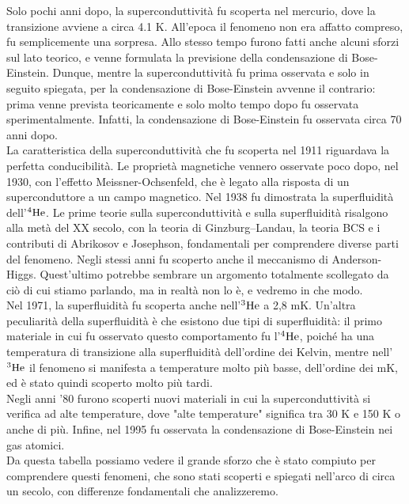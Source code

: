 Solo pochi anni dopo, la superconduttività fu scoperta nel mercurio, dove la transizione avviene a circa 4.1 K. All'epoca il fenomeno non era affatto compreso, fu semplicemente una sorpresa. Allo stesso tempo furono fatti anche alcuni sforzi sul lato teorico, e venne formulata la previsione della condensazione di Bose-Einstein. Dunque, mentre la superconduttività fu prima osservata e solo in seguito spiegata, per la condensazione di Bose-Einstein avvenne il contrario: prima venne prevista teoricamente e solo molto tempo dopo fu osservata sperimentalmente. Infatti, la condensazione di Bose-Einstein fu osservata circa 70 anni dopo.\\
La caratteristica della superconduttività che fu scoperta nel 1911 riguardava la perfetta conducibilità. Le proprietà magnetiche vennero osservate poco dopo, nel 1930, con l'effetto Meissner-Ochsenfeld, che è legato alla risposta di un superconduttore a un campo magnetico. Nel 1938 fu dimostrata la superfluidità dell'$\rm ^4He$. Le prime teorie sulla superconduttività e sulla superfluidità risalgono alla metà del XX secolo, con la teoria di Ginzburg--Landau, la teoria BCS e i contributi di Abrikosov e Josephson, fondamentali per comprendere diverse parti del fenomeno. Negli stessi anni fu scoperto anche il meccanismo di Anderson-Higgs. Quest'ultimo potrebbe sembrare un argomento totalmente scollegato da ciò di cui stiamo parlando, ma in realtà non lo è, e vedremo in che modo.\\
Nel 1971, la superfluidità fu scoperta anche nell'$\rm ^3He$ a 2,8 mK. Un'altra peculiarità della superfluidità è che esistono due tipi di superfluidità: il primo materiale in cui fu osservato questo comportamento fu l'$\rm ^4He$, poiché ha una temperatura di transizione alla superfluidità dell'ordine dei Kelvin, mentre nell'$\rm ^3He$ il fenomeno si manifesta a temperature molto più basse, dell'ordine dei mK, ed è stato quindi scoperto molto più tardi.\\
Negli anni '80 furono scoperti nuovi materiali in cui la superconduttività si verifica ad alte temperature, dove "alte temperature" significa tra 30 K e 150 K o anche di più. Infine, nel 1995 fu osservata la condensazione di Bose-Einstein nei gas atomici.\\
Da questa tabella possiamo vedere il grande sforzo che è stato compiuto per comprendere questi fenomeni, che sono stati scoperti e spiegati nell'arco di circa un secolo, con differenze fondamentali che analizzeremo.\\
